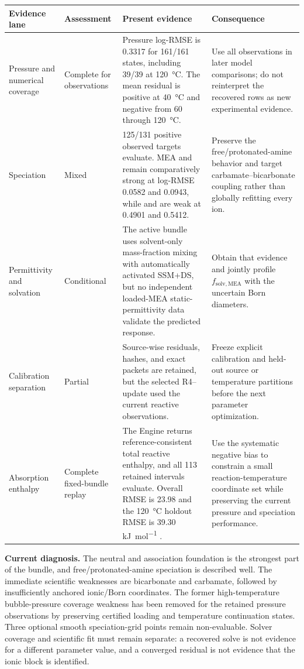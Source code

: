 \documentclass[10pt,oneside]{scrartcl}
\begin{document}
\begin{center}
\vspace{8pt}

\begin{tabularx}{\textwidth}{@{}p{}p{}YY@{}}
\toprule
Evidence lane & Assessment & Present evidence & Consequence \tabularnewline
\midrule
Pressure and numerical coverage & Complete for observations & Pressure
log-RMSE is 0.3317 for 161/161 states, including 39/39 at
\SI{120}{\celsius}. The mean residual is positive at \SI{40}{\celsius} and
negative from 60 through \SI{120}{\celsius}. & Use all observations in later
model comparisons; do not reinterpret the recovered rows as new experimental
evidence. \tabularnewline
Speciation & Mixed & 125/131 positive observed targets evaluate. MEA and
 remain comparatively strong at log-RMSE 0.0582 and 0.0943, while
 and  are weak at 0.4901 and 0.5412. & Preserve the
free/protonated-amine behavior and target carbamate--bicarbonate coupling
rather than globally refitting every ion.
\tabularnewline
Permittivity and solvation & Conditional & The active bundle uses solvent-only
mass-fraction mixing with automatically activated SSM+DS, but no independent
loaded-MEA static-permittivity data validate the predicted response. & Obtain
that evidence and jointly profile $f_{\mathrm{solv},\mathrm{MEA}}$ with the
uncertain Born diameters. \tabularnewline
Calibration separation & Partial & Source-wise residuals, hashes, and exact
packets are retained, but the selected R4-- update used the current
reactive observations. & Freeze explicit calibration and held-out source or
temperature partitions before the next parameter optimization. \tabularnewline
Absorption enthalpy & Complete fixed-bundle replay & The Engine returns
reference-consistent total reactive enthalpy, and all 113 retained intervals
evaluate. Overall RMSE is 23.98 and the \SI{120}{\celsius} holdout RMSE is
39.30 \si{\kilo\joule\per\mole} . & Use the systematic negative bias
to constrain a small reaction-temperature coordinate set while preserving the
current pressure and speciation performance. \tabularnewline
\bottomrule
\end{tabularx}
\end{center}

\textbf{Current diagnosis.} The neutral and association foundation is the
strongest part of the bundle, and free/protonated-amine speciation is described
well. The immediate scientific weaknesses are bicarbonate and carbamate,
followed by insufficiently anchored ionic/Born coordinates. The former
high-temperature bubble-pressure coverage weakness has been removed for the
retained pressure observations by preserving certified loading and temperature
continuation states. Three optional smooth
speciation-grid points remain non-evaluable. Solver coverage and scientific
fit must remain separate: a recovered solve is not evidence for a different
parameter value, and a converged residual is not evidence that the ionic block
is identified.
\end{document}
